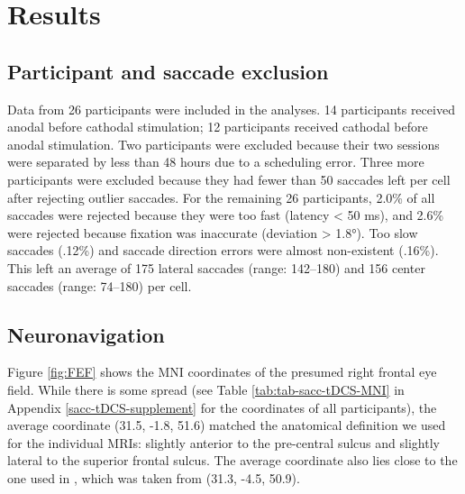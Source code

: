 \documentclass[11pt,english,]{memoir}
\begin{document}
\hypertarget{sacc_tDCS-results}{%
\section{Results}\label{sacc_tDCS-results}}

\hypertarget{participant-and-saccade-exclusion}{%
\subsection{Participant and saccade exclusion}\label{participant-and-saccade-exclusion}}

Data from 26 participants were included in the analyses. 14 participants received anodal before cathodal stimulation; 12 participants received cathodal before anodal stimulation. Two participants were excluded because their two sessions were separated by less than 48 hours due to a scheduling error. Three more participants were excluded because they had fewer than 50 saccades left per cell after rejecting outlier saccades. For the remaining 26 participants, 2.0\% of all saccades were rejected because they were too fast (latency \textless{} 50 ms), and 2.6\% were rejected because fixation was inaccurate (deviation \textgreater{} 1.8°). Too slow saccades (.12\%) and saccade direction errors were almost non-existent (.16\%). This left an average of 175 lateral saccades (range: 142--180) and 156 center saccades (range: 74--180) per cell.

\hypertarget{neuronavigation}{%
\subsection{Neuronavigation}\label{neuronavigation}}

Figure \ref{fig:FEF} shows the MNI coordinates of the presumed right frontal eye field. While there is some spread (see Table \ref{tab:tab-sacc-tDCS-MNI} in Appendix \ref{sacc-tDCS-supplement} for the coordinates of all participants), the average coordinate (31.5, -1.8, 51.6) matched the anatomical definition we used for the individual MRIs: slightly anterior to the pre-central sulcus and slightly lateral to the superior frontal sulcus. The average coordinate also lies close to the one used in \textcite{Kanai2012}, which was taken from \textcite{Paus1996} (31.3, -4.5, 50.9).
\end{document}
